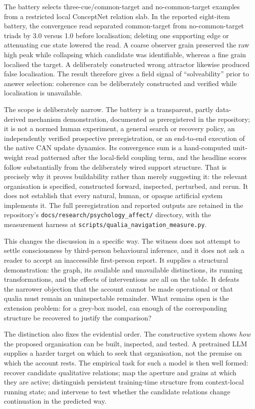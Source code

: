 \documentclass[11pt,a4paper]{article}
\theoremstyle{remark}\newtheorem{remark}[definition]{Remark}
\begin{document}
The battery selects three-cue/common-target and no-common-target examples from a
restricted local ConceptNet relation slab. In the reported eight-item battery, the
convergence read separated common-target from no-common-target triads by 3.0
versus 1.0 before localisation; deleting one supporting edge or attenuating cue
state lowered the read. A coarse observer grain preserved the raw high peak while
collapsing which candidate was identifiable, whereas a fine grain localised the
target. A deliberately constructed wrong attractor likewise produced false
localisation. The result therefore gives a field signal of ``solveability'' prior
to answer selection: coherence can be deliberately constructed and verified while
localisation is unavailable.

The scope is deliberately narrow. The battery is a transparent, partly
data-derived mechanism demonstration, documented as preregistered in the
repository; it is not a normed human experiment, a general search or recovery
policy, an independently verified prospective preregistration, or an end-to-end
execution of the native CAN update dynamics. Its convergence sum is a hand-computed
unit-weight read patterned after the local-field coupling term, and the headline
scores follow substantially from the deliberately wired support structure. That
is precisely why it proves buildability rather than merely suggesting it: the
relevant organisation is specified, constructed forward, inspected, perturbed,
and rerun. It does not establish that every natural, human, or opaque artificial
system implements it. The full preregistration and reported outputs are retained
in the repository's \texttt{docs/research/psychology\_affect/} directory, with
the measurement harness at \texttt{scripts/qualia\_navigation\_measure.py}.

This changes the discussion in a specific way. The witness does not attempt to
settle consciousness by third-person behavioural inference, and it does not ask a
reader to accept an inaccessible first-person report. It supplies a structural
demonstration: the graph, its available and unavailable distinctions, its running
transformations, and the effects of interventions are all on the table. It defeats
the narrower objection that the account cannot be made operational or that qualia
must remain an uninspectable remainder. What remains open is the extension problem:
for a grey-box model, can enough of the corresponding structure be recovered to
justify the comparison?

The distinction also fixes the evidential order. The constructive system shows
\emph{how} the proposed organisation can be built, inspected, and tested. A
pretrained LLM supplies a harder target on which to seek that organisation, not the
premise on which the account rests. The empirical task for such a model is then
well formed: recover candidate qualitative relations; map the aperture and grains
at which they are active; distinguish persistent training-time structure from
context-local running state; and intervene to test whether the candidate relations
change continuation in the predicted way.
\end{document}
